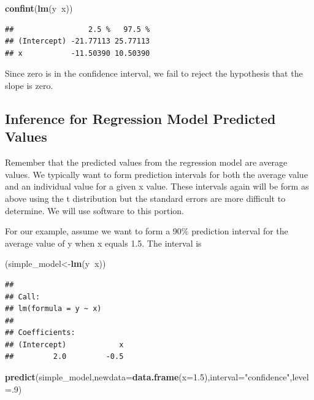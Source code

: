 \documentclass[]{book}
\newenvironment{Shaded}{\begin{snugshade}}{\end{snugshade}}
\newcommand{\KeywordTok}[1]{\textcolor[rgb]{0.13,0.29,0.53}{\textbf{#1}}}
\newcommand{\DataTypeTok}[1]{\textcolor[rgb]{0.13,0.29,0.53}{#1}}
\newcommand{\DecValTok}[1]{\textcolor[rgb]{0.00,0.00,0.81}{#1}}
\newcommand{\FloatTok}[1]{\textcolor[rgb]{0.00,0.00,0.81}{#1}}
\newcommand{\StringTok}[1]{\textcolor[rgb]{0.31,0.60,0.02}{#1}}
\newcommand{\OperatorTok}[1]{\textcolor[rgb]{0.81,0.36,0.00}{\textbf{#1}}}
\newcommand{\NormalTok}[1]{#1}
\theoremstyle{definition}
\theoremstyle{definition}
\theoremstyle{definition}
\theoremstyle{remark}
\begin{document}
\begin{Shaded}
\begin{Highlighting}[]
\KeywordTok{confint}\NormalTok{(}\KeywordTok{lm}\NormalTok{(y}\OperatorTok{~}\NormalTok{x))}
\end{Highlighting}
\end{Shaded}

\begin{verbatim}
##                 2.5 %   97.5 %
## (Intercept) -21.77113 25.77113
## x           -11.50390 10.50390
\end{verbatim}

Since zero is in the confidence interval, we fail to reject the
hypothesis that the slope is zero.

\subsection{Inference for Regression Model Predicted
Values}\label{inference-for-regression-model-predicted-values}

Remember that the predicted values from the regression model are average
values. We typically want to form prediction intervals for both the
average value and an individual value for a given x value. These
intervals again will be form as above using the t distribution but the
standard errors are more difficult to determine. We will use software to
this portion.

For our example, assume we want to form a 90\% prediction interval for
the average value of y when x equals 1.5. The interval is

\begin{Shaded}
\begin{Highlighting}[]
\NormalTok{(simple_model<-}\KeywordTok{lm}\NormalTok{(y}\OperatorTok{~}\NormalTok{x))}
\end{Highlighting}
\end{Shaded}

\begin{verbatim}
## 
## Call:
## lm(formula = y ~ x)
## 
## Coefficients:
## (Intercept)            x  
##         2.0         -0.5
\end{verbatim}

\begin{Shaded}
\begin{Highlighting}[]
\KeywordTok{predict}\NormalTok{(simple_model,}\DataTypeTok{newdata=}\KeywordTok{data.frame}\NormalTok{(}\DataTypeTok{x=}\FloatTok{1.5}\NormalTok{),}\DataTypeTok{interval=}\StringTok{"confidence"}\NormalTok{,}\DataTypeTok{level=}\NormalTok{.}\DecValTok{9}\NormalTok{)}
\end{Highlighting}
\end{Shaded}
\end{document}
